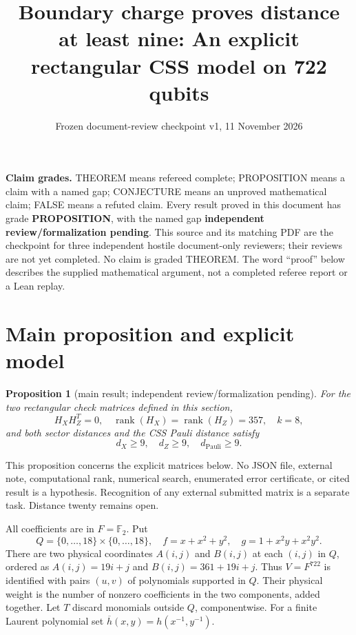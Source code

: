 \documentclass{article}
\title{Boundary charge proves distance at least nine: An explicit rectangular CSS model on 722 qubits}
\author{}
\date{Frozen document-review checkpoint v1, 11 November 2026}
\newtheorem{proposition}{Proposition}
\DeclareMathOperator{\rank}{rank}
\begin{document}
\maketitle

\textbf{Claim grades.} THEOREM means refereed complete; PROPOSITION means a claim with a
named gap; CONJECTURE means an unproved mathematical claim; FALSE means a refuted claim. Every
result proved in this document has grade \textbf{PROPOSITION}, with the named gap
\textbf{independent review\slash formalization pending}. This source and its matching PDF are the
checkpoint for three independent hostile document-only reviewers; their reviews are not yet
completed. No claim is graded THEOREM. The word ``proof'' below describes the supplied
mathematical argument, not a completed referee report or a Lean replay.

\section{Main proposition and explicit model}\label{sec:model}

\begin{proposition}[main result; independent review\slash formalization pending]\label{prop:main}
  For the two rectangular check matrices defined in this section,
  \begin{equation}
    H_X H_Z^T = 0, \quad
    \rank(H_X) = \rank(H_Z) = 357, \quad k = 8,
  \end{equation}
  and both sector distances and the CSS Pauli distance satisfy
  \begin{equation}
    d_X \ge 9, \quad d_Z \ge 9, \quad d_{\text{Pauli}} \ge 9.
  \end{equation}
\end{proposition}

This proposition concerns the explicit matrices below. No JSON file, external note,
computational rank, numerical search, enumerated error certificate, or cited result is a
hypothesis. Recognition of any external submitted matrix is a separate task. Distance twenty
remains open.

All coefficients are in \(F = \mathbb{F}_2\). Put
\begin{equation}
  Q = \{0, \dots, 18\} \times \{0, \dots, 18\}, \quad
  f = x + x^2 + y^2, \quad g = 1 + x^2 y + x^2 y^2.
\end{equation}
There are two physical coordinates \(A(i,j)\) and \(B(i,j)\) at each \((i,j)\) in \(Q\),
ordered as \(A(i,j) = 19i + j\) and \(B(i,j) = 361 + 19i + j\). Thus \(V = F^{722}\) is
identified with pairs \((u, v)\) of polynomials supported in \(Q\). Their physical weight is
the number of nonzero coefficients in the two components, added together. Let \(T\) discard
monomials outside \(Q\), componentwise. For a finite Laurent polynomial set
\(\overline{h}(x,y) = h(x^{-1}, y^{-1})\).
\end{document}
